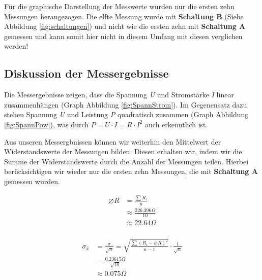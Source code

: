 \documentclass[10pt,a4paper]{article}
\begin{document}
\begin{flushleft}
Für die graphische Darstellung der Messwerte wurden nur die ersten zehn Messungen herangezogen. Die elfte Messung wurde mit \textbf{Schaltung B} (Siehe Abbildung \ref{fig:schaltungen}) und nicht wie die ersten zehn mit \textbf{Schaltung A} gemessen und kann somit hier nicht in diesem Umfang mit diesen verglichen werden!
\end{flushleft}

\subsection{Diskussion der Messergebnisse}
\begin{flushleft}
Die Messergebnisse zeigen, dass die Spannung \textit{U} und Stromstärke \textit{I} linear zusammenhängen (Graph Abbildung \ref{fig:SpannStrom}). Im Gegenensatz dazu stehen Spannung \textit{U} und Leistung \textit{P} quadratisch zusammen (Graph Abbildung \ref{fig:SpannPow}), was durch $P = U \cdot I = R \cdot I^2$ auch erkenntlich ist.

Aus unseren Messergbnissen können wir weiterhin den Mittelwert der Widerstandswerte der Messungen bilden. Diesen erhalten wir, indem wir die Summe der Widerstandswerte durch die Anzahl der Messungen teilen. Hierbei berücksichtigen wir wieder nur die ersten zehn Messungen, die mit \textbf{Schaltung A} gemessen wurden.
\end{flushleft}

\begin{figure}[h]
\centering
\begin{subfigure}[c]{0.5\textwidth}
\begin{align*}
\varnothing R &= \frac{\sum R_i}{n} \\
&\approx \frac{226.396 \Omega}{10} \\
&\approx 22.64 \Omega \\
\end{align*}
\end{subfigure}%
\begin{subfigure}[c]{0.5\textwidth}
\begin{align*}
\sigma_{\bar{x}} &= \frac{\sigma}{\sqrt{n}} = \sqrt{\frac{\sum(R_i - \varnothing R)^2}{n-1}} \cdot \frac{1}{\sqrt{n}} \\
&= \frac{0.23615 \Omega}{\sqrt{10}} \\
&\approx 0.075 \Omega
\end{align*}
\end{subfigure}%
\end{figure}
\end{document}
